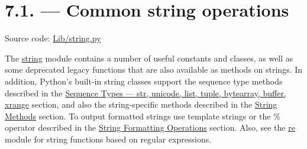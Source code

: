 \documentclass[a4paper,12pt]{report}
\begin{document}
\section*{7.1.  — Common string operations}
 \par
\noindent 
Source code: \href{https://github.com/python/cpython/tree/2.7/Lib/string.py}{Lib/string.py}
 \par
\vspace{12pt}
\noindent 
The \href{https://docs.python.org/2/library/string.html}{string}
 module contains a number of useful constants and classes, as well as some deprecated legacy functions that are also available as methods on strings. In addition, Python’s built-in string classes support the sequence type methods described in the \href{https://docs.python.org/2/library/stdtypes.html}{Sequence Types — str, unicode, list, tuple, bytearray, buffer, xrange}
 section, and also the string-specific methods described in the \href{https://docs.python.org/2/library/stdtypes.html}{String Methods}
 section. To output formatted strings use template strings or the  $  \%  $ operator described in the \href{https://docs.python.org/2/library/stdtypes.html}{String Formatting Operations}
 section. Also, see the \href{https://docs.python.org/2/library/re.html}{re}
 module for string functions based on regular expressions. \par
\noindent 
\end{document}
